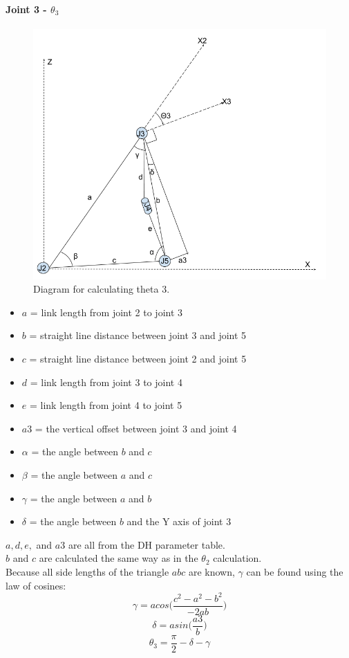 \documentclass{article}
\begin{document}
\paragraph{Joint 3 - $\theta _3$}
\begin{figure}[H]
    \includegraphics[width=\linewidth]{theta3.png}
    \caption{Diagram for calculating theta 3.}
    \label{fig:theta3}
\end{figure}
\begin{itemize}
    \item $a$ = link length from joint 2 to joint 3
    \item $b$ = straight line distance between joint 3 and joint 5
    \item $c$ = straight line distance between joint 2 and joint 5
    \item $d$ = link length from joint 3 to joint 4
    \item $e$ = link length from joint 4 to joint 5
    \item $a3$ = the vertical offset between joint 3 and joint 4
    \item $\alpha$ = the angle between $b$ and $c$
    \item $\beta$ = the angle between $a$ and $c$
    \item $\gamma$ = the angle between $a$ and $b$
    \item $\delta$ = the angle between $b$ and the Y axis of joint 3
\end{itemize}
$a, d, e,$ and $a3$ are all from the DH parameter table. \\
$b$ and $c$ are calculated the same way as in the $\theta _2$ calculation. \\
Because all side lengths of the triangle $abc$ are known, $\gamma$ can be found using the law of cosines:
\[\gamma = acos\bigg(\frac{c^2 - a^2 - b^2}{-2ab}\bigg)\]
\[\delta = asin\bigg(\frac{a3}{b}\bigg)\]
\[\theta _3 = \frac{\pi}{2} - \delta - \gamma\]
\end{document}
